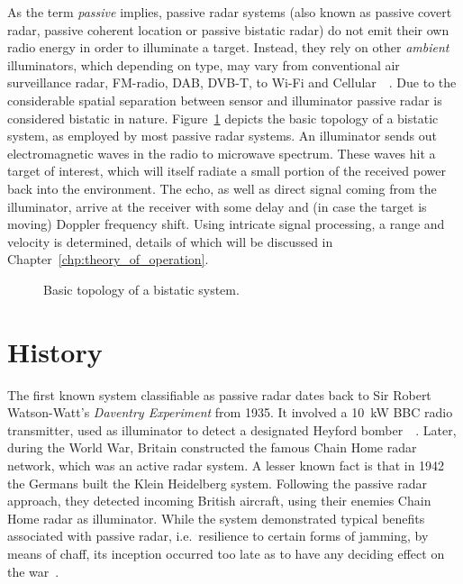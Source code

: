 As the term \emph{passive} implies, passive radar systems (also known as passive covert radar, passive coherent location or passive bistatic radar) do not emit their own radio energy in order to illuminate a target. Instead, they rely on other \emph{ambient} illuminators, which depending on type, may vary from conventional air surveillance radar, FM-radio, DAB, DVB-T, to Wi-Fi and Cellular~\cite[pp.~48--77]{Malanowski2019}\ \cite{Kuschel2013}. Due to the considerable spatial separation between sensor and illuminator passive radar is considered bistatic in nature. Figure~\ref{fig:topology} depicts the basic topology of a bistatic system, as employed by most passive radar systems. An illuminator sends out electromagnetic waves in the radio to microwave spectrum. These waves hit a target of interest, which will itself radiate a small portion of the received power back into the environment. The echo, as well as direct signal coming from the illuminator, arrive at the receiver with some delay and (in case the target is moving) Doppler frequency shift. Using intricate signal processing, a range and velocity is determined, details of which will be discussed in Chapter~\ref{chp:theory_of_operation}.

\begin{figure}
    \centering
    \caption{Basic topology of a bistatic system.}\label{fig:topology}
\end{figure}

\section{History}

The first known system classifiable as passive radar dates back to Sir Robert Watson-Watt's \emph{Daventry Experiment} from 1935. It involved a \SI{10}{\kilo\watt} BBC radio transmitter, used as illuminator to detect a designated Heyford bomber~\cite[pp.~5--6]{Malanowski2019}~\cite{Kuschel2013}. Later, during the  World War, Britain constructed the famous Chain Home radar network, which was an active radar system. A lesser known fact is that in 1942 the Germans built the Klein Heidelberg system. Following the passive radar approach, they detected incoming British aircraft, using their enemies Chain Home radar as illuminator. While the system demonstrated typical benefits associated with passive radar, i.e.\ resilience to certain forms of jamming, by means of chaff, its inception occurred too late as to have any deciding effect on the war~\cite{Griffiths2010}.

